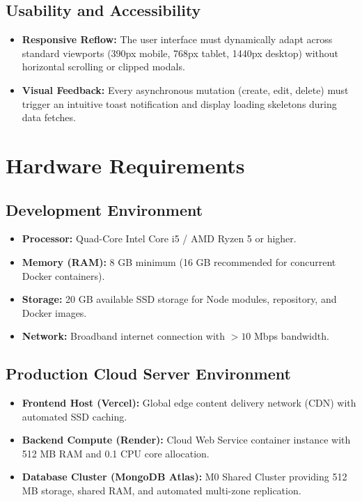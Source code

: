 \subsection{Usability and Accessibility}
\begin{itemize}
    \item \textbf{Responsive Reflow:} The user interface must dynamically adapt across standard viewports (390px mobile, 768px tablet, 1440px desktop) without horizontal scrolling or clipped modals.
    \item \textbf{Visual Feedback:} Every asynchronous mutation (create, edit, delete) must trigger an intuitive toast notification and display loading skeletons during data fetches.
\end{itemize}

\section{Hardware Requirements}
\subsection{Development Environment}
\begin{itemize}
    \item \textbf{Processor:} Quad-Core Intel Core i5 / AMD Ryzen 5 or higher.
    \item \textbf{Memory (RAM):} 8 GB minimum (16 GB recommended for concurrent Docker containers).
    \item \textbf{Storage:} 20 GB available SSD storage for Node modules, repository, and Docker images.
    \item \textbf{Network:} Broadband internet connection with $>10$ Mbps bandwidth.
\end{itemize}

\subsection{Production Cloud Server Environment}
\begin{itemize}
    \item \textbf{Frontend Host (Vercel):} Global edge content delivery network (CDN) with automated SSD caching.
    \item \textbf{Backend Compute (Render):} Cloud Web Service container instance with 512 MB RAM and 0.1 CPU core allocation.
    \item \textbf{Database Cluster (MongoDB Atlas):} M0 Shared Cluster providing 512 MB storage, shared RAM, and automated multi-zone replication.
\end{itemize}

